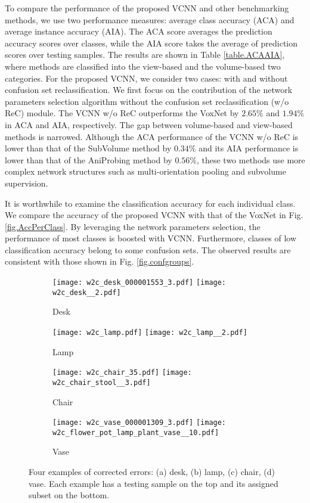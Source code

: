 \documentclass[preprint,12pt]{elsarticle}
\begin{document}
To compare the performance of the proposed VCNN and other benchmarking
methods, we use two performance measures: average class accuracy (ACA)
and average instance accuracy (AIA). The ACA score averages the prediction accuracy scores over classes, while the AIA score takes the average of prediction scores over testing samples. The results are shown in Table
\ref{table.ACAAIA}, where methods are classified into the view-based and
the volume-based two categories.  For the proposed VCNN, we consider two
cases: with and without confusion set reclassification. We first focus
on the contribution of the network parameters selection algorithm
without the confusion set reclassification (w/o ReC) module.  The VCNN
w/o ReC outperforms the VoxNet by $2.65\%$ and $1.94\%$ in ACA and
AIA, respectively. The gap between volume-based and view-based methods
is narrowed. Although the ACA performance of the VCNN w/o ReC is lower
than that of the SubVolume method by $0.34\%$ and its AIA performance is
lower than that of the AniProbing method by $0.56\%$, these
two methods use more complex network structures such as
multi-orientation pooling and subvolume supervision. 

It is worthwhile to examine the classification accuracy for each
individual class. We compare the accuracy of the proposed VCNN with that
of the VoxNet in Fig.  \ref{fig.AccPerClass}. By leveraging the
network parameters selection, the performance of most classes is boosted
with VCNN.  Furthermore, classes of low classification accuracy belong
to some confusion sets. The observed results are consistent with those
shown in Fig. \ref{fig.confgroups}. 

\begin{figure}[th!]
\centering
\begin{subfigure}[b] {0.4\linewidth}
\centering
\texttt{[image: w2c\_desk\_000001553\_3.pdf]}
\texttt{[image: w2c\_desk\_\_2.pdf]}
\caption{Desk}
\end{subfigure}
\centering
\begin{subfigure}[b] {0.4\linewidth}
\centering
\texttt{[image: w2c\_lamp.pdf]}
\texttt{[image: w2c\_lamp\_\_2.pdf]}
\caption{Lamp}
\end{subfigure}
\centering
\begin{subfigure}[b] {0.4\linewidth}
\centering
\texttt{[image: w2c\_chair\_35.pdf]}
\texttt{[image: w2c\_chair\_stool\_\_3.pdf]}
\caption{Chair}
\end{subfigure}
\centering
\begin{subfigure}[b] {0.4\linewidth}
\centering
\texttt{[image: w2c\_vase\_000001309\_3.pdf]}
\texttt{[image: w2c\_flower\_pot\_lamp\_plant\_vase\_\_10.pdf]}
\caption{Vase}
\end{subfigure}
\caption{Four examples of corrected errors: (a) desk, (b) lamp, (c)
chair, (d) vase. Each example has a testing sample on the top and
its assigned subset on the bottom. }\label{fig.wrong2correct}
\vspace{-1.5em}
\end{figure}
\end{document}
